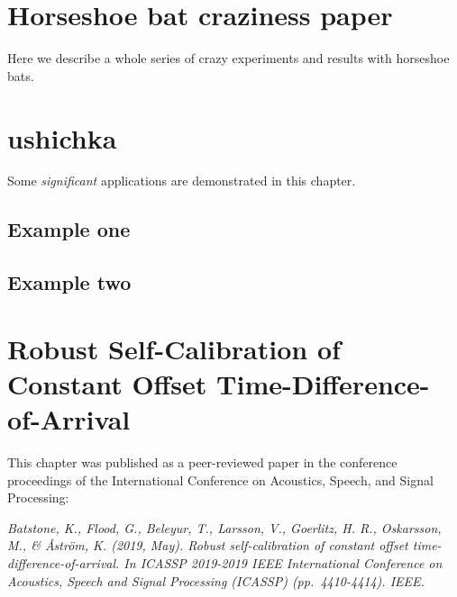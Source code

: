 \documentclass[
]{book}
\begin{document}
\begin{figure}
{}
\label{cpn_figS5}
\end{figure}

\hypertarget{horseshoe-bat-craziness-paper}{%
\chapter{Horseshoe bat craziness paper}\label{horseshoe-bat-craziness-paper}}

Here we describe a whole series of crazy experiments and results with horseshoe bats.

\hypertarget{ushichka}{%
\chapter{ushichka}\label{ushichka}}

Some \emph{significant} applications are demonstrated in this chapter.

\hypertarget{example-one}{%
\section{Example one}\label{example-one}}

\hypertarget{example-two}{%
\section{Example two}\label{example-two}}

\hypertarget{robust-self-calibration-of-constant-offset-time-difference-of-arrival}{%
\chapter{Robust Self-Calibration of Constant Offset Time-Difference-of-Arrival}\label{robust-self-calibration-of-constant-offset-time-difference-of-arrival}}


This chapter was published as a peer-reviewed paper in the conference proceedings of the International Conference on Acoustics, Speech, and Signal Processing:

\emph{Batstone, K., Flood, G., Beleyur, T., Larsson, V., Goerlitz, H. R., Oskarsson, M., \& Åström, K. (2019, May). Robust self-calibration of constant offset time-difference-of-arrival. In ICASSP 2019-2019 IEEE International Conference on Acoustics, Speech and Signal Processing (ICASSP) (pp.~4410-4414). IEEE.}

\newpage
\end{document}

